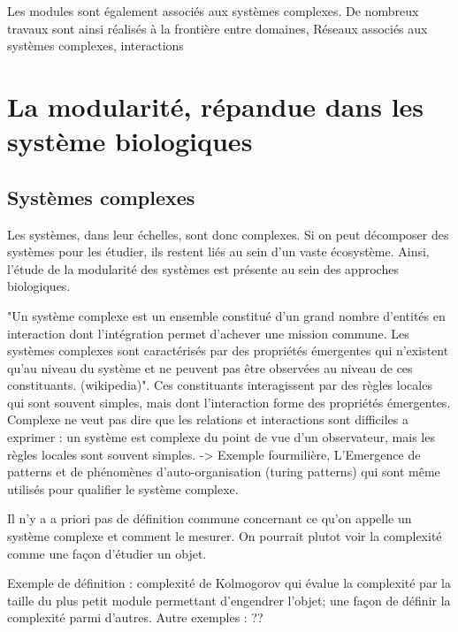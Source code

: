 Les modules sont également associés aux systèmes complexes. De nombreux travaux sont ainsi réalisés à la frontière entre domaines, 
Réseaux associés aux systèmes complexes, interactions




\section{La modularité, répandue dans les système biologiques}

\subsection{Systèmes complexes }

Les systèmes, dans leur échelles, sont donc complexes. Si on peut décomposer des systèmes pour les étudier, ils restent liés au sein d'un vaste écosystème. Ainsi, l'étude de la modularité des systèmes est présente au sein des approches biologiques.

"Un système complexe est un ensemble constitué d'un grand nombre d'entités en interaction dont l'intégration permet d'achever une mission commune. Les systèmes complexes sont caractérisés par des propriétés émergentes qui n'existent qu'au niveau du système et ne peuvent pas être observées au niveau de ces constituants. (wikipedia)". Ces constituants interagissent par des règles locales qui sont souvent simples, mais dont l'interaction forme des propriétés émergentes. Complexe ne veut pas dire que les relations et interactions sont difficiles a exprimer : un système est complexe du point de vue d'un observateur, mais les règles locales sont souvent simples. 
-> Exemple fourmilière, 
L'Emergence de patterns et de phénomènes d'auto-organisation (turing patterns) \cite{turing52} qui sont même utilisés pour qualifier le système complexe. 

Il n'y a a priori pas de définition commune concernant ce qu'on appelle un système complexe et comment le mesurer. On pourrait plutot voir la complexité comme une façon d'étudier un objet. 

Exemple de définition : complexité de Kolmogorov qui évalue la complexité par la taille du plus petit module permettant d'engendrer l'objet; une façon de définir la complexité parmi d'autres. Autre exemples : ??



